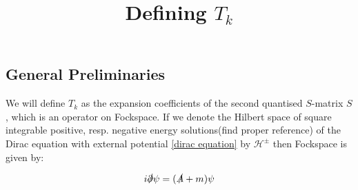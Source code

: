 \documentclass[a4paper,12pt]{article}
\begin{document}
\title{ Defining \(T_k\)}
%
%

\begin{center}
\section{ General Preliminaries}
\end{center}

We will define \(T_k\) as the expansion coefficients of the second quantised \(S\)-matrix \(S\), which is an operator on Fockspace. If we denote the Hilbert space of square integrable positive, resp. negative energy solutions(find proper reference) of the Dirac equation with external potential \eqref{dirac equation} by \(\mathcal{H}^\pm\) then Fockspace is given by:

\begin{equation}\label{dirac equation}
i \slashed{\partial} \psi = (\slashed{A}+m) \psi
\end{equation}
\end{document}

